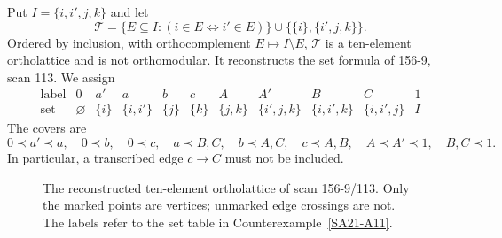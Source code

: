 \begin{counterexample}
\label{SA21-A11}
Put $I=\{i,i',j,k\}$ and let
\[
 \mathcal T=\{E\subseteq I:(i\in E\Longleftrightarrow i'\in E)\}
       \cup\{\{i\},\{i',j,k\}\}.
\]
Ordered by inclusion, with orthocomplement $E\mapsto I\setminus E$,
$\mathcal T$ is a ten-element ortholattice and is not orthomodular.
It reconstructs the set formula of 156-9, scan 113. We assign
\[
\begin{array}{c|cccccccccc}
\text{label}&0&a'&a&b&c&A&A'&B&C&1\\ \hline
\text{set}&\varnothing&\{i\}&\{i,i'\}&\{j\}&\{k\}&
\{j,k\}&\{i',j,k\}&\{i,i',k\}&\{i,i',j\}&I
\end{array}
\]
The covers are
\[
0\prec a'\prec a,\quad0\prec b,\quad0\prec c,\quad
a\prec B,C,\quad b\prec A,C,\quad c\prec A,B,\quad
A\prec A'\prec1,\quad B,C\prec1.
\]
In particular, a transcribed edge $c\to C$ must not be included.
\end{counterexample}
\begin{figure}[htbp]
\centering
{}
\caption{The reconstructed ten-element ortholattice of scan 156-9/113.
Only the marked points are vertices; unmarked edge crossings are not.
The labels refer to the set table in Counterexample~\ref{SA21-A11}.}
\label{fig:ten-element}
\end{figure}
